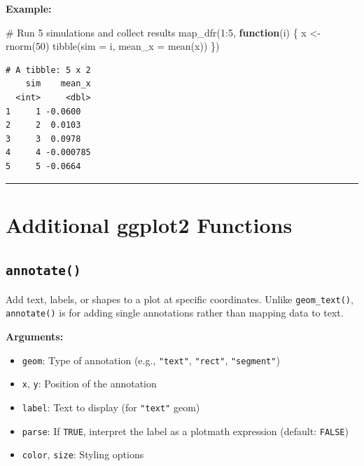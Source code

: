 \documentclass[
  letterpaper,
  DIV=11,
  numbers=noendperiod]{scrreprt}
\newenvironment{Shaded}{\begin{snugshade}}{\end{snugshade}}
\newcommand{\AttributeTok}[1]{\textcolor[rgb]{0.40,0.45,0.13}{#1}}
\newcommand{\CommentTok}[1]{\textcolor[rgb]{0.37,0.37,0.37}{#1}}
\newcommand{\ControlFlowTok}[1]{\textcolor[rgb]{0.00,0.23,0.31}{\textbf{#1}}}
\newcommand{\DecValTok}[1]{\textcolor[rgb]{0.68,0.00,0.00}{#1}}
\newcommand{\FunctionTok}[1]{\textcolor[rgb]{0.28,0.35,0.67}{#1}}
\newcommand{\NormalTok}[1]{\textcolor[rgb]{0.00,0.23,0.31}{#1}}
\newcommand{\OtherTok}[1]{\textcolor[rgb]{0.00,0.23,0.31}{#1}}
\newcommand{\SpecialCharTok}[1]{\textcolor[rgb]{0.37,0.37,0.37}{#1}}
\providecommand{\tightlist}{%
  \setlength{\itemsep}{0pt}\setlength{\parskip}{0pt}}
\begin{document}
\textbf{Example:}

\begin{Shaded}
\begin{Highlighting}[]
\CommentTok{\# Run 5 simulations and collect results}
\FunctionTok{map\_dfr}\NormalTok{(}\DecValTok{1}\SpecialCharTok{:}\DecValTok{5}\NormalTok{, }\ControlFlowTok{function}\NormalTok{(i) \{}
\NormalTok{  x }\OtherTok{\textless{}{-}} \FunctionTok{rnorm}\NormalTok{(}\DecValTok{50}\NormalTok{)}
  \FunctionTok{tibble}\NormalTok{(}\AttributeTok{sim =}\NormalTok{ i, }\AttributeTok{mean\_x =} \FunctionTok{mean}\NormalTok{(x))}
\NormalTok{\})}
\end{Highlighting}
\end{Shaded}

\begin{verbatim}
# A tibble: 5 x 2
    sim    mean_x
  <int>     <dbl>
1     1 -0.0600  
2     2  0.0103  
3     3  0.0978  
4     4 -0.000785
5     5 -0.0664  
\end{verbatim}

\begin{center}\rule{0.5\linewidth}{0.5pt}\end{center}

\section{Additional ggplot2
Functions}\label{additional-ggplot2-functions}

\subsection{\texorpdfstring{\texttt{annotate()}}{annotate()}}\label{annotate}

Add text, labels, or shapes to a plot at specific coordinates. Unlike
\texttt{geom\_text()}, \texttt{annotate()} is for adding single
annotations rather than mapping data to text.

\textbf{Arguments:}

\begin{itemize}
\tightlist
\item
  \texttt{geom}: Type of annotation (e.g., \texttt{"text"},
  \texttt{"rect"}, \texttt{"segment"})
\item
  \texttt{x}, \texttt{y}: Position of the annotation
\item
  \texttt{label}: Text to display (for \texttt{"text"} geom)
\item
  \texttt{parse}: If \texttt{TRUE}, interpret the label as a plotmath
  expression (default: \texttt{FALSE})
\item
  \texttt{color}, \texttt{size}: Styling options
\end{itemize}
\end{document}
